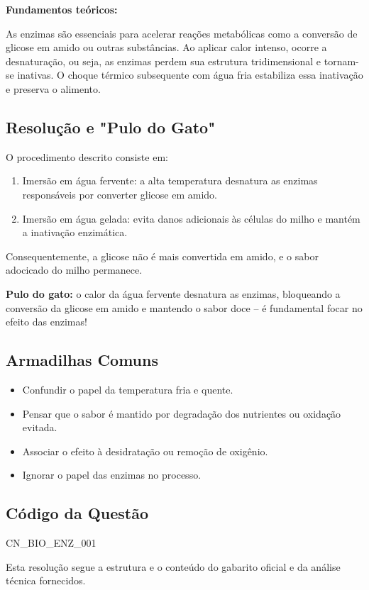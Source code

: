 \documentclass{article}
\begin{document}
\textbf{Fundamentos teóricos:}

As enzimas são essenciais para acelerar reações metabólicas como a conversão de glicose em amido ou outras substâncias. Ao aplicar calor intenso, ocorre a desnaturação, ou seja, as enzimas perdem sua estrutura tridimensional e tornam-se inativas. O choque térmico subsequente com água fria estabiliza essa inativação e preserva o alimento.

\subsection*{Resolução e "Pulo do Gato"}

O procedimento descrito consiste em:

\begin{enumerate}
  \item Imersão em água fervente: a alta temperatura desnatura as enzimas responsáveis por converter glicose em amido.
  \item Imersão em água gelada: evita danos adicionais às células do milho e mantém a inativação enzimática.
\end{enumerate}

\noindent Consequentemente, a glicose não é mais convertida em amido, e o sabor adocicado do milho permanece.

\textbf{Pulo do gato:} o calor da água fervente desnatura as enzimas, bloqueando a conversão da glicose em amido e mantendo o sabor doce – é fundamental focar no efeito das enzimas!

\subsection*{Armadilhas Comuns}

\begin{itemize}
  \item Confundir o papel da temperatura fria e quente.
  \item Pensar que o sabor é mantido por degradação dos nutrientes ou oxidação evitada.
  \item Associar o efeito à desidratação ou remoção de oxigênio.
  \item Ignorar o papel das enzimas no processo.
\end{itemize}

\subsection*{Código da Questão}

CN\_BIO\_ENZ\_001

\vspace{0.5cm}

\noindent Esta resolução segue a estrutura e o conteúdo do gabarito oficial e da análise técnica fornecidos.
\end{document}

